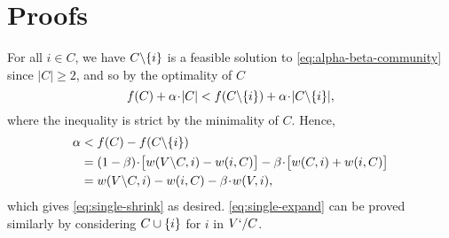 \section{Proofs}
\label{sec:proofs}

\begin{Proof} 
	
	For all $i\in C$, we have $C\backslash \{i\}$ is a feasible solution to
	\eqref{eq:alpha-beta-community} since $|C| \geq 2$, and so by the optimality of $C$
	$$f(C) + \alpha \!\cdot\! |C| < f(C\backslash \{i\}) + \alpha \!\cdot\!
	|C\backslash \{i\}|,$$
	where the inequality is strict by the minimality of $C$. 
	Hence,
	\begin{align*}
	\alpha &< f(C) - f(C\backslash \{i\}) 
	\\ &
	= (1-\beta)\!\cdot\! \big[w(V\backslash C,i) - w(i,C) \big] - \beta\!\cdot\! \big[w(C,i) + w(i,C) \big]
	\\ &
	= w(V\backslash C,i) - w(i,C)  - \beta\!\cdot\! w(V,i),
	\end{align*}
	which gives \eqref{eq:single-shrink} as desired. \eqref{eq:single-expand} can be proved similarly by considering $C\cup \{i\}$ for $i$ in $V`/C$.
	
        

\end{Proof}
